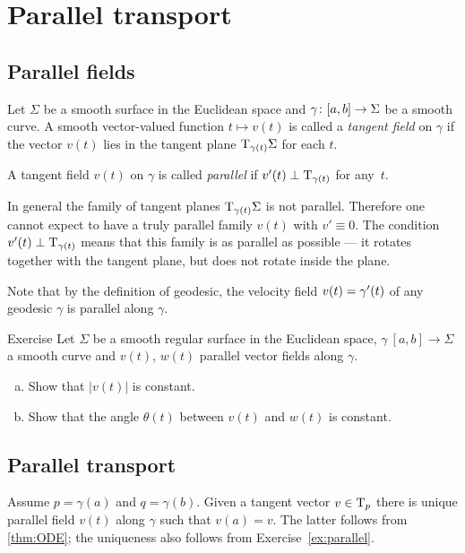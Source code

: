 \chapter{Parallel transport}

\section*{Parallel fields}

Let $\Sigma$ be a smooth surface in the Euclidean space and $\gamma\:[a,b]\z\to \Sigma$ be a smooth curve.
A smooth vector-valued function $t\mapsto v(t)$ is called a \emph{tangent field} on $\gamma$ if
the vector $v(t)$ lies in the tangent plane $\mathrm{T}_{\gamma(t)}\Sigma$ for each $t$.

A tangent field $v(t)$ on $\gamma$ is called \emph{parallel} if $v'(t)\perp\mathrm{T}_{\gamma(t)}$ for any~$t$.

In general the family of tangent planes $\mathrm{T}_{\gamma(t)}\Sigma$ is not parallel.
Therefore one cannot expect to have a truly parallel family $v(t)$ with $v'\equiv 0$.
The condition $v'(t)\perp\mathrm{T}_{\gamma(t)}$ means that this family is as parallel as possible --- it rotates together with the tangent plane, but does not rotate inside the plane.

Note that by the definition of geodesic, the velocity field $v(t)\z=\gamma'(t)$ of any geodesic $\gamma$ is parallel along $\gamma$.

\begin{thm}{Exercise}\label{ex:parallel}
Let $\Sigma$ be a smooth regular surface in the Euclidean space, 
$\gamma\:[a,b]\to \Sigma$ a smooth curve 
and $v(t)$, $w(t)$ parallel vector fields along $\gamma$.
\begin{enumerate}[(a)]
 \item Show that $|v(t)|$ is constant.
 \item Show that the angle $\theta(t)$ between $v(t)$ and $w(t)$ is constant.
\end{enumerate}
\end{thm}

\section*{Parallel transport}

Assume $p=\gamma(a)$ and $q=\gamma(b)$.
Given a tangent vector $v\in\mathrm{T}_p$ there is unique parallel field $v(t)$ along $\gamma$ such that $v(a)=v$.
The latter follows from \ref{thm:ODE}; the uniqueness also follows from Exercise~\ref{ex:parallel}.

